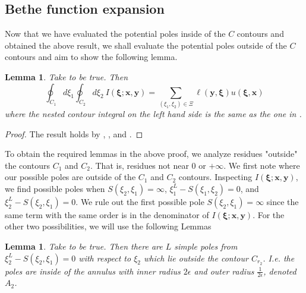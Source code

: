 \documentclass[a4paper,11pt]{article}
\newtheorem{lemma}[theorem]{Lemma}
\theoremstyle{definition}
\begin{document}
\subsection{Bethe function expansion}\label{sub:Bethe function expansion}
Now that we have evaluated the potential poles inside of the $C$ contours and obtained the above result, we shall evaluate the potential poles outside of the $C$ contours and aim to show the following lemma. 

\begin{lemma}\label{l: Bethe function expansion}
Take  to be true. Then
    \begin{equation}
      \oint_{C_1}d\xi_1\oint_{C_2}d\xi_2 \ I(\boldsymbol{\xi};\mathbf{x},\mathbf{y})=\sum_{(\xi_1,\xi_2)\in\Xi}
      \ell(\mathbf{y}, \boldsymbol{\xi})u(\boldsymbol{\xi}, \mathbf{x})
\end{equation}
where the nested contour integral on the left hand side is the same as the one in .
\end{lemma}

\begin{proof}
    The result holds by , , and .
\end{proof}

To obtain the required lemmas in the above proof, we analyze residues "outside" the contours $C_1$ and $C_2$. That is, residues not near $0$ or $+\infty$. We first note where our possible poles are outside of the $C_1$ and $C_2$ contours. Inspecting $I(\boldsymbol{\xi};\mathbf{x},\mathbf{y})$, we find possible poles when $S(\xi_2,\xi_1)=\infty$, $\xi_1^L-S(\xi_1,\xi_2)=0$, and $\xi_2^L-S(\xi_2,\xi_1)=0$. We rule out the first possible pole $S(\xi_2,\xi_1)=\infty$ since the same term with the same order is in the denominator of $I(\boldsymbol{\xi};\mathbf{x},\mathbf{y})$. For the other two possibilities, we will use the following Lemmas 

\begin{lemma}\label{l: AllPoles}
Take  to be true. Then there are $L$ simple poles from $\xi_2^L-S(\xi_2,\xi_1)=0$ with respect to $\xi_2$ which lie outside the contour $C_{r_2}$. I.e. the poles are inside of the annulus with inner radius $2 \epsilon$ and outer radius $\frac{1}{2\epsilon}$, denoted $A_2$.
\end{lemma}
\end{document}
